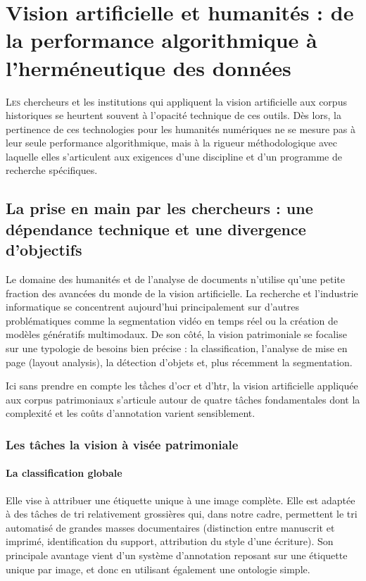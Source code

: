 \chapter[Vision artificielle et humanités]{Vision artificielle et humanités : de la performance algorithmique à l'herméneutique des données}

\lettrine{L}{es} chercheurs et les institutions qui appliquent la vision artificielle aux corpus historiques se heurtent souvent à l'opacité technique de ces outils. Dès lors, la pertinence de ces technologies pour les humanités numériques ne se mesure pas à leur seule performance algorithmique, mais à la rigueur méthodologique avec laquelle elles s'articulent aux exigences d'une discipline et d'un programme de recherche spécifiques.

\section[La prise en main par les chercheurs]{La prise en main par les chercheurs : une dépendance technique et une divergence d'objectifs}

Le domaine des humanités et de l'analyse de documents n'utilise qu'une petite fraction des avancées du monde de la vision artificielle. La recherche et l'industrie informatique se concentrent aujourd'hui principalement sur d'autres problématiques comme la segmentation vidéo en temps réel ou la création de modèles génératifs multimodaux. De son côté, la vision patrimoniale se focalise sur une typologie de besoins bien précise : la classification, l'analyse de mise en page (layout analysis), la détection d'objets et, plus récemment la segmentation.

Ici sans prendre en compte les tầches d'\gls{ocr} et d'\gls{htr}, la vision artificielle appliquée aux corpus patrimoniaux s'articule autour de quatre tâches fondamentales dont la complexité et les coûts d'annotation varient sensiblement. 

\subsection{Les tâches la vision à visée patrimoniale}

\subsubsection{La classification globale} Elle vise à attribuer une étiquette unique à une image complète. Elle est adaptée à des tâches de tri relativement grossières qui, dans notre cadre, permettent le tri automatisé de grandes masses documentaires (distinction entre manuscrit et imprimé, identification du support, attribution du style d'une écriture). Son principale avantage vient d'un système d'annotation reposant sur une étiquette unique par image, et donc en utilisant également une ontologie simple.

